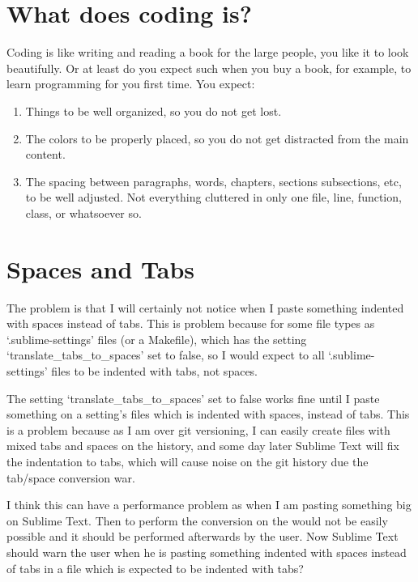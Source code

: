 \begin{englishtext}
    \section{What does coding is?}

    Coding is like writing and reading a book for the large people, you like it
    to look beautifully. Or at least do you expect such when you buy a book, for
    example, to learn programming for you first time. You expect: %

    \begin{enumerate}
        \item Things to be well organized, so you do not get lost.

        \item The colors to be properly placed, so you do not get distracted
           from the main content.

        \item The spacing between paragraphs, words, chapters, sections
           subsections, etc, to be well adjusted. Not everything cluttered in
           only one file, line, function, class, or whatsoever so.
    \end{enumerate}



    \section{Spaces and Tabs}

    The problem is that I will certainly not notice when I paste something
    indented with spaces instead of tabs. This is problem because for some file
    types as `.sublime-settings' files (or a Makefile), which has the setting
    `translate\_tabs\_to\_spaces' set to false, so I would expect to all
    `.sublime-settings' files to be indented with tabs, not spaces.
    \cite{tabsAndSpacesConversion}

    The setting `translate\_tabs\_to\_spaces' set to false works fine until I paste
    something on a setting's files which is indented with spaces, instead of
    tabs. This is a problem because as I am over git versioning, I can easily
    create files with mixed tabs and spaces on the history, and some day later
    Sublime Text will fix the indentation to tabs, which will cause noise on the
    git history due the tab/space conversion war. %

    I think this can have a performance problem as when I am pasting something
    big on Sublime Text. Then to perform the conversion on the would not be
    easily possible and it should be performed afterwards by the user. Now
    Sublime Text should warn the user when he is pasting something indented with
    spaces instead of tabs in a file which is expected to be indented with tabs?


\end{englishtext}
